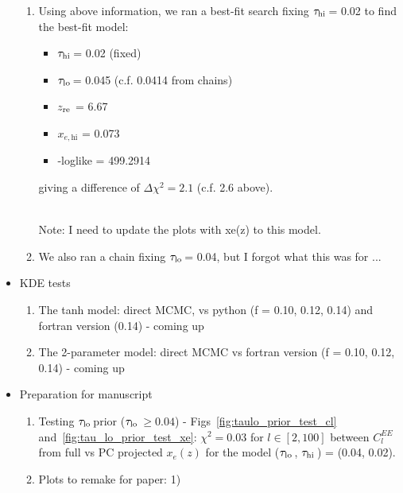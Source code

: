 \documentclass[prd,amsmath,amssymb,floatfix,superscriptaddress,nofootinbib]{revtex4-1}
\newcommand{\tauhi}{$\tau_{\rm hi}\,$}
\newcommand{\taulo}{$\tau_{\rm lo}\,$}
\begin{document}
\begin{itemize}
{\begin{enumerate}
{\begin{itemize}
                \item {$x_{e, \mathrm{hi}}$ = 0.0214}
                \item {-loglike = 498.2425} 
            \end{itemize}
             }
            \item{Using above information, we ran a best-fit search fixing \tauhi = 0.02 to find the best-fit model:
            \begin{itemize}
                \item {\tauhi = 0.02 (fixed)}
                \item {\taulo = 0.045 (c.f. 0.0414 from chains)} 
                \item {$z_{\rm re}$ = 6.67} 
                \item {$x_{e, \mathrm{hi}}$ = 0.073}
                \item {-loglike = 499.2914} 
            \end{itemize} 
            giving a difference of $\Delta \chi^2 = 2.1$  (c.f. 2.6 above).}\\
            Note: I need to update the plots with xe(z) to this model.
            \item{We also ran a chain fixing \taulo = 0.04, but I forgot what this was for ...}
        \end{enumerate}
        }
        
    \item {KDE tests
        \begin{enumerate}
            \item {The tanh model: direct MCMC, vs python (f = 0.10, 0.12, 0.14) and fortran version (0.14) - coming up}
            \item {The 2-parameter model: direct MCMC vs fortran version (f = 0.10, 0.12, 0.14) - coming up}
        \end{enumerate}
    }
        
    \item {Preparation for manuscript
        \begin{enumerate}
            \item {Testing \taulo prior (\taulo $\geq 0.04$) - Figs~\ref{fig:taulo_prior_test_cl} and~\ref{fig:tau_lo_prior_test_xe}: $\chi^2 = 0.03$ for $l\in[2, 100]$ between $C_l^{EE}$ from full vs PC projected $x_e(z)$ for the model (\taulo, \tauhi) = (0.04, 0.02).}
            \item {Plots to remake for paper: 1) }
        \end{enumerate}
    }
    
\end{itemize} 
\end{document}
